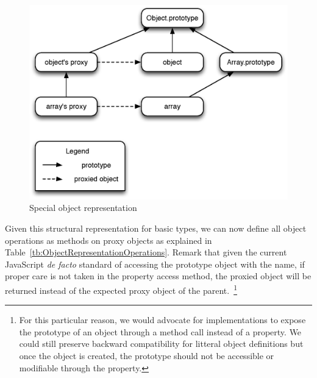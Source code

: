 \begin{figure}[htb]
\begin{center}
\includegraphics[scale=0.75]{figures/specialRepresentation}
\caption{\label{fig:SpecialRepresentation} Special object representation}
\end{center}
\end{figure}

Given this structural representation for basic types, we can now define all
object operations as methods on proxy objects as explained in
Table~\ref{tb:ObjectRepresentationOperations}. Remark that given the current
JavaScript \textit{de facto} standard of accessing the prototype object with
the  name, if proper care is not taken in the property access
method, the proxied object will be returned instead of the expected proxy
object of the parent.~\footnote{For this particular reason, we would advocate
for implementations to expose the prototype of an object through a method call
instead of a property. We could still preserve backward compatibility for
litteral object definitions but once the object is created, the prototype
should not be accessible or modifiable through the  property.}

